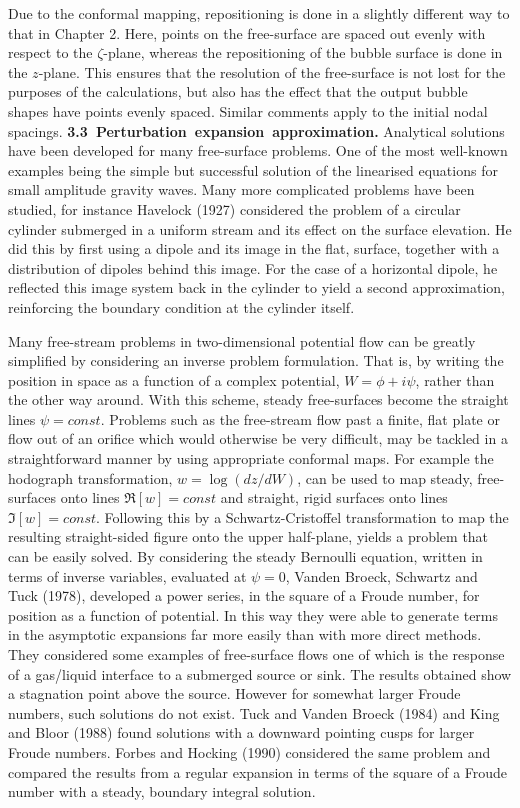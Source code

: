 Due to the conformal mapping,
repositioning is done in a slightly different way to that in 
Chapter 2. Here, points on the free-surface are spaced out evenly with
respect to the $\zeta$-plane, whereas the repositioning 
of the bubble surface is done in the $z$-plane. This ensures
that the resolution of the free-surface is not lost for the 
purposes of the calculations, but also has the effect that the output
bubble shapes have points evenly spaced. Similar comments apply to the
initial nodal spacings.
\pg
\hbox{\bf 3.3 Perturbation expansion approximation.}
\vskip 5pt
Analytical solutions have been developed for many free-surface problems.
One of the most well-known examples being the simple but successful 
solution of the linearised equations for small amplitude gravity waves.
Many more complicated problems have been studied, for instance
Havelock (1927) considered the problem of a circular 
cylinder submerged in a uniform stream and its effect on the 
surface elevation. He did this by first using a dipole
and its image in the flat, surface, together with a 
distribution of dipoles behind this image. For the case of a 
horizontal dipole, he reflected this image system back in the 
cylinder to yield a second approximation, reinforcing the boundary
condition at the cylinder itself.

Many free-stream problems in two-dimensional potential flow
can be greatly simplified by considering an inverse problem
formulation. That is, by writing the position in space as  
a function of a complex potential, $W=\phi+i\psi$, 
rather than the other way around. With this scheme, 
steady free-surfaces become the straight lines $\psi=const$.
Problems such as the free-stream flow past a finite, flat plate
or flow out of an orifice which would otherwise be very
difficult, may be tackled in a straightforward manner by
using appropriate conformal maps. For example the 
hodograph transformation, $w=\log(dz/dW)$, can be used  to  map 
steady,
free-surfaces onto lines $\Re[w]=const$ and straight, rigid surfaces onto
lines $\Im[w]=const$. Following this by a Schwartz-Cristoffel
transformation to map the resulting straight-sided figure onto 
the upper half-plane, yields a problem that can be easily solved.
By considering the steady 
Bernoulli equation, written in terms of inverse variables,
evaluated at $\psi=0$, Vanden Broeck, Schwartz and Tuck (1978),
developed a power series, in the square of a Froude number,
for position as a function of potential. In this way they were
able to generate terms in the asymptotic expansions 
far more easily than with more direct methods. 
They considered some examples of free-surface flows one of which
is the response of a gas/liquid interface to a submerged source or sink.
The results obtained show a stagnation point above the source. 
However for somewhat larger Froude numbers, such solutions do not 
exist. Tuck and Vanden Broeck (1984) and King and Bloor (1988)
found solutions with a downward pointing cusps for larger Froude numbers. 
Forbes and Hocking (1990) considered the same problem and compared 
the results from a regular expansion in terms of the square of 
a Froude number with a steady, boundary integral solution.

